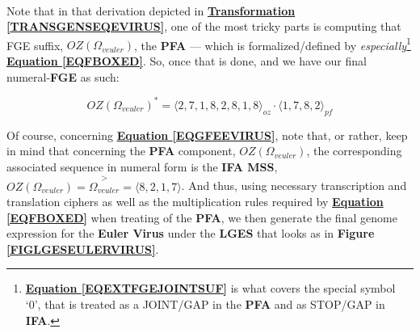 \documentclass[a4paper, 18pt]{book} %
\newtheorem{trans}{Transformation}
\begin{document}
\begin{center}
\\
\end{center}


Note that in that derivation depicted in \textbf{\hyperref[TRANSGENSEQEVIRUS]{Transformation \ref{TRANSGENSEQEVIRUS}}}, one of the most tricky parts is computing that FGE suffix, $\boxed{OZ(\Omega_{veuler})}$, the \textbf{PFA} --- which is formalized/defined by \textit{especially}\footnote{\textbf{\hyperref[EQEXTFGEJOINTSUF]{Equation \ref{EQEXTFGEJOINTSUF}}} is what covers the special symbol `0', that is treated as a JOINT/GAP in the \textbf{PFA} and as STOP/GAP in \textbf{IFA}.} \textbf{\hyperref[EQFBOXED]{Equation \ref{EQFBOXED}}}. So, once that is done, and we have our final numeral-\textbf{FGE} as such:

\begin{equation}
\label{EQGFEEVIRUS}
\boxed{OZ(\Omega_{veuler})}^* =  \langle 2,7,1,8,2,8,1,8 \rangle_{oz}\cdot\boxed{\langle 1, 7, 8, 2 \rangle}_{pf}
\end{equation}

Of course, concerning \textbf{\hyperref[EQGFEEVIRUS]{Equation \ref{EQGFEEVIRUS}}}, note that, or rather, keep in mind that concerning the \textbf{PFA} component, $\boxed{OZ(\Omega_{veuler})}$, the corresponding associated sequence in numeral form is the \textbf{IFA MSS}, $OZ(\Omega_{veuler}) = \overset{>}{\Omega_{veuler}} = \langle 8, 2, 1, 7 \rangle$. And thus, using necessary transcription and translation ciphers as well as the multiplication rules required by \textbf{\hyperref[EQFBOXED]{Equation \ref{EQFBOXED}}} when treating of the \textbf{PFA}, we then generate the final genome expression for the \textbf{Euler Virus} under the \textbf{LGES} that looks as in \textbf{Figure \ref{FIGLGESEULERVIRUS}}.
\end{document}
